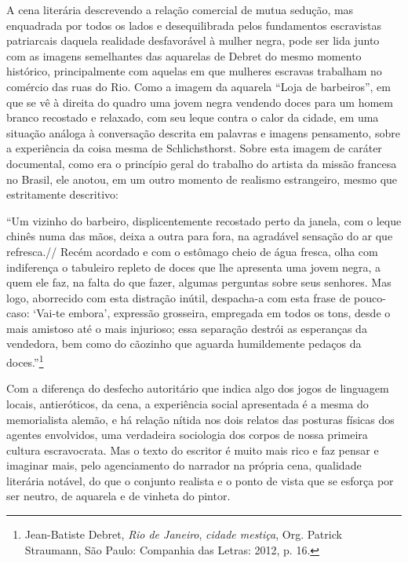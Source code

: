 A cena literária descrevendo a relação comercial de mutua sedução, mas
enquadrada por todos os lados e desequilibrada pelos fundamentos
escravistas patriarcais daquela realidade desfavorável à mulher negra,
pode ser lida junto com as imagens semelhantes das aquarelas de Debret
do mesmo momento histórico, principalmente com aquelas em que mulheres
escravas trabalham no comércio das ruas do Rio. Como a imagem da
aquarela ``Loja de barbeiros'', em que se vê à direita do quadro uma
jovem negra vendendo doces para um homem branco recostado e relaxado,
com seu leque contra o calor da cidade, em uma situação análoga à
conversação descrita em palavras e imagens pensamento, sobre a
experiência da coisa mesma de Schlichsthorst. Sobre esta imagem de
caráter documental, como era o princípio geral do trabalho do artista da
missão francesa no Brasil, ele anotou, em um outro momento de realismo
estrangeiro, mesmo que estritamente descritivo:

``Um vizinho do barbeiro, displicentemente recostado perto da janela,
com o leque chinês numa das mãos, deixa a outra para fora, na agradável
sensação do ar que refresca.// Recém acordado e com o estômago cheio de
água fresca, olha com indiferença o tabuleiro repleto de doces que lhe
apresenta uma jovem negra, a quem ele faz, na falta do que fazer,
algumas perguntas sobre seus senhores. Mas logo, aborrecido com esta
distração inútil, despacha-a com esta frase de pouco-caso: `Vai-te
embora', expressão grosseira, empregada em todos os tons, desde o mais
amistoso até o mais injurioso; essa separação destrói as esperanças da
vendedora, bem como do cãozinho que aguarda humildemente pedaços da
doces.''\footnote{Jean-Batiste Debret, \emph{Rio de Janeiro},
  \emph{cidade mestiça}, Org. Patrick Straumann, São Paulo: Companhia
  das Letras: 2012, p. 16.}

Com a diferença do desfecho autoritário que indica algo dos jogos de
linguagem locais, antieróticos, da cena, a experiência social
apresentada é a mesma do memorialista alemão, e há relação nítida nos
dois relatos das posturas físicas dos agentes envolvidos, uma verdadeira
sociologia dos corpos de nossa primeira cultura escravocrata. Mas o
texto do escritor é muito mais rico e faz pensar e imaginar mais, pelo
agenciamento do narrador na própria cena, qualidade literária notável,
do que o conjunto realista e o ponto de vista que se esforça por ser
neutro, de aquarela e de vinheta do pintor.

